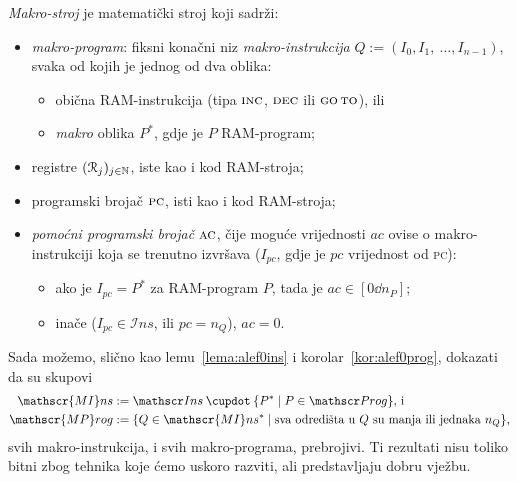 \begin{definicija}[{name=[makro-stroj]}]
\emph{Makro-stroj} je matematički stroj koji sadrži:
\begin{itemize}
    \item \emph{makro-program}: fiksni konačni niz \emph{makro-instrukcija} $Q:=(I_0, I_1,~\dotsc, I_{n-1})$, svaka od kojih je jednog od dva oblika:
    \begin{itemize}
        \item obična RAM-instrukcija (tipa $\textsc{inc}$, $\textsc{dec}$ ili $\textsc{go\,to}$), ili
        \item  \emph{makro} oblika $P^*$, gdje je $P$ RAM-program;
    \end{itemize}
    \item registre $(\mathcal R_{j})_{j\in{\mathbb N}}$, iste kao i kod RAM-stroja;
    \item programski brojač $\textsc{pc}$, isti kao i kod RAM-stroja;
    \item \emph{pomoćni programski brojač} $\textsc{ac}$, čije  moguće vrijednosti $ac$ ovise o makro-instrukciji koja se trenutno izvršava ($I_{pc}$, gdje je $pc$ vrijednost od \textsc{pc}):
    \begin{itemize}
        \item ako je $I_{pc}=P^*$ za RAM-program $P$, tada je $ac\in[0\dd n_P]$;
        \item inače ($I_{pc}\in\mathscr Ins$, ili $pc=n_Q$), $ac=0$.\qedhere
    \end{itemize}
\end{itemize}
\end{definicija}
\noindent Sada možemo, slično kao lemu~\ref{lema:alef0ins} i korolar~\ref{kor:alef0prog}, dokazati da su skupovi
\begin{align}
\mathscr{MI}ns&:=\mathscr Ins\mathbin{\dcup}\{P^*\mid P\in\mathscr Prog\}\text{, i}\\
\mathscr{MP}rog&:=\{Q\in\mathscr{MI}ns^*\mid\text{sva odredišta u $Q$ su manja ili jednaka $n_Q$}\}\text,
\end{align}
svih makro-instrukcija, i svih makro-programa, prebrojivi. Ti rezultati nisu toliko bitni zbog tehnika koje ćemo uskoro razviti, ali predstavljaju dobru vježbu. %


